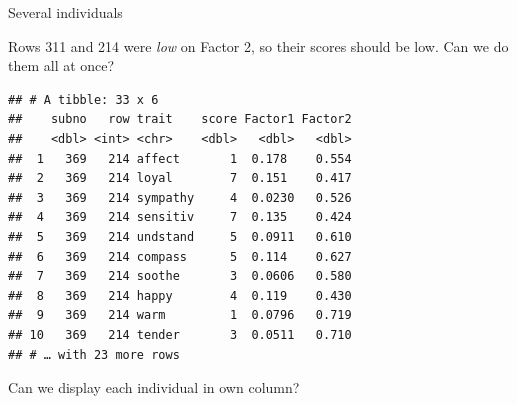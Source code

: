 \documentclass[ignorenonframetext,]{beamer}
\newenvironment{Shaded}{\begin{snugshade}}{\end{snugshade}}
\newcommand{\DecValTok}[1]{\textcolor[rgb]{0.00,0.00,0.81}{#1}}
\newcommand{\FloatTok}[1]{\textcolor[rgb]{0.00,0.00,0.81}{#1}}
\newcommand{\KeywordTok}[1]{\textcolor[rgb]{0.13,0.29,0.53}{\textbf{#1}}}
\newcommand{\NormalTok}[1]{#1}
\newcommand{\OperatorTok}[1]{\textcolor[rgb]{0.81,0.36,0.00}{\textbf{#1}}}
\newcommand{\StringTok}[1]{\textcolor[rgb]{0.31,0.60,0.02}{#1}}
\begin{document}
\begin{frame}[fragile]{Several individuals}
\protect\hypertarget{several-individuals}{}

Rows 311 and 214 were \emph{low} on Factor 2, so their scores should be
low. Can we do them all at once?

\footnotesize

\begin{Shaded}
\end{Shaded}

\begin{verbatim}
## # A tibble: 33 x 6
##    subno   row trait    score Factor1 Factor2
##    <dbl> <int> <chr>    <dbl>   <dbl>   <dbl>
##  1   369   214 affect       1  0.178    0.554
##  2   369   214 loyal        7  0.151    0.417
##  3   369   214 sympathy     4  0.0230   0.526
##  4   369   214 sensitiv     7  0.135    0.424
##  5   369   214 undstand     5  0.0911   0.610
##  6   369   214 compass      5  0.114    0.627
##  7   369   214 soothe       3  0.0606   0.580
##  8   369   214 happy        4  0.119    0.430
##  9   369   214 warm         1  0.0796   0.719
## 10   369   214 tender       3  0.0511   0.710
## # … with 23 more rows
\end{verbatim}

\normalsize

Can we display each individual in own column?

\end{frame}
\end{document}
